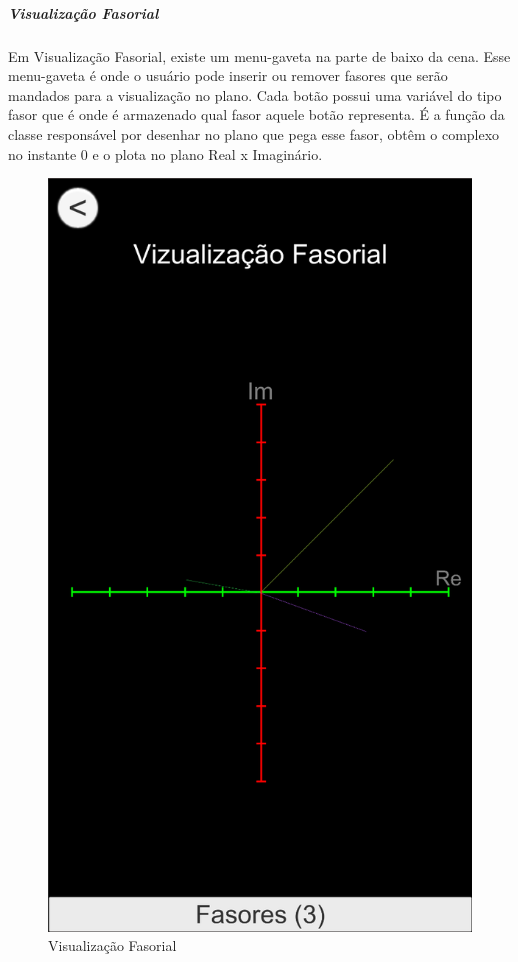 \documentclass[conference,harvard, brazil]{sbatex}
\begin{document}
	\subparagraph{Visualização Fasorial}Em Visualização Fasorial, existe um menu-gaveta na parte de baixo da cena. Esse menu-gaveta é onde o usuário pode inserir ou remover fasores que serão mandados para a visualização no plano. Cada botão possui uma variável do tipo fasor que é onde é armazenado qual fasor aquele botão representa. É a função da classe responsável por desenhar no plano que pega esse fasor, obtêm o complexo no instante 0 e o plota no plano Real x Imaginário.
	\begin{figure}[h]
		\centering
		\includegraphics[scale=0.25]{app_2}
		\caption{Visualização Fasorial}
	\end{figure}
\end{document}
